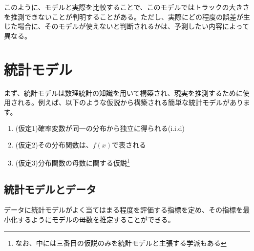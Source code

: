 このように、モデルと実際を比較することで、このモデルではトラックの大きさを推測できないことが判明することがある。ただし、実際にどの程度の誤差が生じた場合に、そのモデルが使えないと判断されるかは、予測したい内容によって異なる。


\section{統計モデル}
まず、統計モデルは数理統計の知識を用いて構築され、現実を推測するために使用される。例えば、以下のような仮説から構築される簡単な統計モデルがあります。

\begin{enumerate}
 \item (仮定1)確率変数が同一の分布から独立に得られる(i.i.d)
 \item (仮定2)その分布関数は、$f(x)$で表される
 \item (仮定3)分布関数の母数に関する仮説\footnote{なお、中には三番目の仮説のみを統計モデルと主張する学派もある\cite{塩見_正衛2021}}
\end{enumerate}

\subsection{統計モデルとデータ}
データに統計モデルがよく当てはまる程度を評価する指標を定め、その指標を最小化するようにモデルの母数を推定することができる。



